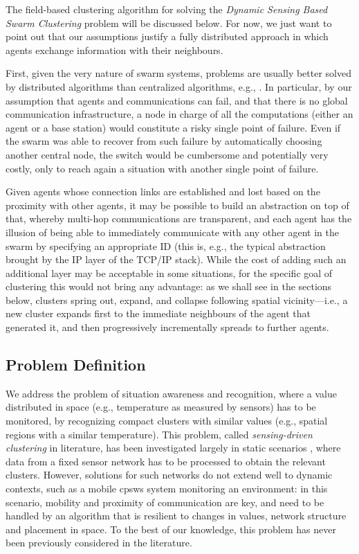 {The field-based clustering algorithm for solving the {\em Dynamic Sensing Based Swarm Clustering} problem will be discussed below. For now, we just want to point out that our assumptions justify a fully distributed approach in which agents exchange information with their neighbours.

First, given the very nature of swarm systems, 
 problems are usually better solved by distributed algorithms than centralized algorithms, e.g., \cite{hoshino:2013,DBLP:journals/asc/CruzNM17}. 
 In particular, by our assumption that agents and communications can fail, 
 and that there is no global communication infrastructure, 
 a node in charge of all the computations (either an agent or a base station) 
 would constitute a risky single point of failure. 
 Even if the swarm was able to recover from such failure by automatically choosing another central node, the switch would be cumbersome and potentially very costly, only to reach again a situation with another single point of failure.

Given agents whose connection links are established and lost based on the proximity with other agents, 
 it may be possible to build an abstraction on top of that, 
 whereby multi-hop communications are transparent, 
 and each agent has the illusion of being able to immediately communicate with any other agent in the swarm by specifying an appropriate ID 
 (this is, e.g., the typical abstraction brought by the IP layer of the TCP/IP stack). 
 While the cost of adding such an additional layer may be acceptable in some situations, for the specific goal of clustering this would not bring any advantage: as we shall see in the sections below, clusters spring out, expand, and collapse following spatial vicinity---i.e., a new cluster expands first to the immediate neighbours of the agent that generated it, and then progressively incrementally spreads to further agents.
}

\subsection{Problem Definition}\label{ssec:problem-def}

We address the problem of situation awareness and recognition, where a value distributed in space (e.g., temperature as measured by sensors) has to be monitored,
 by recognizing compact clusters with similar values (e.g., spatial regions with a similar temperature).
 This problem, called \emph{sensing-driven clustering} in literature, has been investigated largely in static scenarios \cite{DBLP:journals/jaihc/KucukBSK20,DBLP:journals/ijcomsys/PhamLPC10,DBLP:conf/ccnc/LinM07},
 where data from a fixed sensor network has to be processed to obtain the relevant clusters.
 However, solutions for such networks do not extend well to dynamic contexts, such as a mobile \acp{cpsw} system monitoring an environment:
 in this scenario, mobility and proximity of communication are key,
 and need to be handled by an algorithm that is resilient to changes in values, network structure and placement in space.
 To the best of our knowledge, this problem has never been previously considered in the literature.

